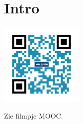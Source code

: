 
\section*{Intro}
\begin{minipage}{.25\linewidth}
	\raggedright
	\includegraphics[width=4cm]{6_afgeleiden_integralen/inputs/QR_Code_INTRO_module6}
\end{minipage}
\begin{minipage}{.7\linewidth}
	Zie filmpje MOOC.
\end{minipage}



